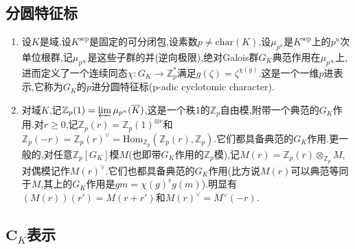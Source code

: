 \subsection{分圆特征标}
\begin{enumerate}
	\item 设$K$是域,设$K^{\mathrm{sep}}$是固定的可分闭包,设素数$p\not=\mathrm{char}(K)$,设$\mu_{p^n}$是$K^{\mathrm{sep}}$上的$p^n$次单位根群,记$\mu_{p^{\infty}}$是这些子群的并(逆向极限),绝对Galois群$G_K$典范作用在$\mu_{p^{\infty}}$上,进而定义了一个连续同态$\chi:G_K\to\mathbb{Z}_p^*$满足$g(\zeta)=\zeta^{\chi(g)}$.这是一个一维$p$进表示,它称为$G_K$的$p$进分圆特征标(p-adic cyclotomic character).
	\item 对域$K$,记$\mathbb{Z}_p(1)=\varprojlim\mu_{p^n}(\overline{K})$,这是一个秩1的$\mathbb{Z}_p$自由模,附带一个典范的$G_K$作用.对$r\ge0$,记$\mathbb{Z}_p(r)=\mathbb{Z}_p(1)^{\otimes r}$和$\mathbb{Z}_p(-r)=\mathbb{Z}_p(r)^{\vee}=\mathrm{Hom}_{\mathbb{Z}_p}(\mathbb{Z}_p(r),\mathbb{Z}_p)$.它们都具备典范的$G_K$作用.更一般的,对任意$\mathbb{Z}_p[G_K]$模$M$(也即带$G_K$作用的$\mathbb{Z}_p$模),记$M(r)=\mathbb{Z}_p(r)\otimes_{\mathbb{Z}_p}M$,对偶模记作$M(r)^{\vee}$.它们也都具备典范的$G_K$作用(比方说$M(r)$可以典范等同于$M$,其上的$G_K$作用是$gm=\chi(g)^rg(m)$).明显有$(M(r))(r')=M(r+r')$和$M(r)^{\vee}=M^{\vee}(-r)$.
\end{enumerate}
\subsection{$\textbf{C}_K$表示}

